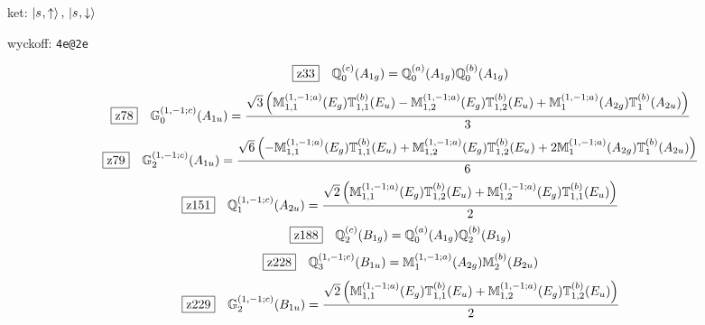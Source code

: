 \documentclass[fleqn,10pt,landscape]{jsarticle}
\begin{document}
\noindent\quad * ket: $\ket{s_{},\uparrow},\, \ket{s_{},\downarrow}$

\noindent\quad * wyckoff: \texttt{4e@2e}

\begin{dmath*}
\hspace*{3mm}\fbox{z33}\quad \mathbb{Q}_{0}^{(c)}(A_{1g})=\mathbb{Q}_{0}^{(a)}(A_{1g}) \mathbb{Q}_{0}^{(b)}(A_{1g})
\end{dmath*}
\begin{dmath*}
\hspace*{3mm}\fbox{z78}\quad \mathbb{G}_{0}^{(1,-1;c)}(A_{1u})=\frac{\sqrt{3} \left(\mathbb{M}_{1,1}^{(1,-1;a)}(E_{g}) \mathbb{T}_{1,1}^{(b)}(E_{u}) - \mathbb{M}_{1,2}^{(1,-1;a)}(E_{g}) \mathbb{T}_{1,2}^{(b)}(E_{u}) + \mathbb{M}_{1}^{(1,-1;a)}(A_{2g}) \mathbb{T}_{1}^{(b)}(A_{2u})\right)}{3}
\end{dmath*}
\begin{dmath*}
\hspace*{3mm}\fbox{z79}\quad \mathbb{G}_{2}^{(1,-1;c)}(A_{1u})=\frac{\sqrt{6} \left(- \mathbb{M}_{1,1}^{(1,-1;a)}(E_{g}) \mathbb{T}_{1,1}^{(b)}(E_{u}) + \mathbb{M}_{1,2}^{(1,-1;a)}(E_{g}) \mathbb{T}_{1,2}^{(b)}(E_{u}) + 2 \mathbb{M}_{1}^{(1,-1;a)}(A_{2g}) \mathbb{T}_{1}^{(b)}(A_{2u})\right)}{6}
\end{dmath*}
\begin{dmath*}
\hspace*{3mm}\fbox{z151}\quad \mathbb{Q}_{1}^{(1,-1;c)}(A_{2u})=\frac{\sqrt{2} \left(\mathbb{M}_{1,1}^{(1,-1;a)}(E_{g}) \mathbb{T}_{1,2}^{(b)}(E_{u}) + \mathbb{M}_{1,2}^{(1,-1;a)}(E_{g}) \mathbb{T}_{1,1}^{(b)}(E_{u})\right)}{2}
\end{dmath*}
\begin{dmath*}
\hspace*{3mm}\fbox{z188}\quad \mathbb{Q}_{2}^{(c)}(B_{1g})=\mathbb{Q}_{0}^{(a)}(A_{1g}) \mathbb{Q}_{2}^{(b)}(B_{1g})
\end{dmath*}
\begin{dmath*}
\hspace*{3mm}\fbox{z228}\quad \mathbb{Q}_{3}^{(1,-1;c)}(B_{1u})=\mathbb{M}_{1}^{(1,-1;a)}(A_{2g}) \mathbb{M}_{2}^{(b)}(B_{2u})
\end{dmath*}
\begin{dmath*}
\hspace*{3mm}\fbox{z229}\quad \mathbb{G}_{2}^{(1,-1;c)}(B_{1u})=\frac{\sqrt{2} \left(\mathbb{M}_{1,1}^{(1,-1;a)}(E_{g}) \mathbb{T}_{1,1}^{(b)}(E_{u}) + \mathbb{M}_{1,2}^{(1,-1;a)}(E_{g}) \mathbb{T}_{1,2}^{(b)}(E_{u})\right)}{2}
\end{dmath*}
\end{document}
